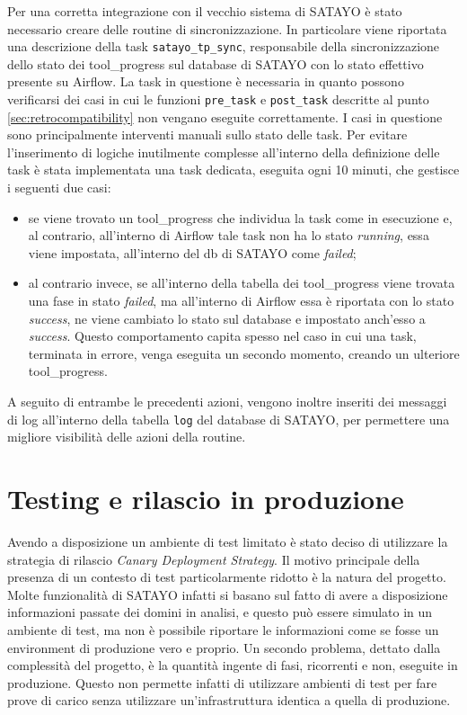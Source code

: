 Per una corretta integrazione con il vecchio sistema di SATAYO è stato necessario
creare delle routine di sincronizzazione. In particolare viene riportata una
descrizione della task \texttt{satayo\_tp\_sync}, responsabile della
sincronizzazione dello stato dei tool\_progress sul database di SATAYO con lo
stato effettivo presente su Airflow. La task in questione è necessaria in quanto
possono verificarsi dei casi in cui le funzioni \texttt{pre\_task} e \texttt{post\_task}
descritte al punto \ref{sec:retrocompatibility} non vengano eseguite correttamente.
I casi in questione sono principalmente interventi manuali sullo stato delle
task. Per evitare l'inserimento di logiche inutilmente complesse all'interno della
definizione delle task è stata implementata una task dedicata, eseguita ogni 10
minuti, che gestisce i seguenti due casi:

\begin{itemize}
  \item se viene trovato un tool\_progress che individua la task come in esecuzione
    e, al contrario, all'interno di Airflow tale task non ha lo stato \textit{running},
    essa viene impostata, all'interno del db di SATAYO come \textit{failed};

  \item al contrario invece, se all'interno della tabella dei tool\_progress
    viene trovata una fase in stato \textit{failed}, ma all'interno di Airflow
    essa è riportata con lo stato \textit{success}, ne viene cambiato lo stato
    sul database e impostato anch'esso a \textit{success}. Questo comportamento
    capita spesso nel caso in cui una task, terminata in errore, venga eseguita
    un secondo momento, creando un ulteriore tool\_progress.
\end{itemize}

A seguito di entrambe le precedenti azioni, vengono inoltre inseriti dei messaggi
di log all'interno della tabella \texttt{log} del database di SATAYO, per permettere
una migliore visibilità delle azioni della routine.

\section{Testing e rilascio in produzione}
\label{sec:deployment}

Avendo a disposizione un ambiente di test limitato è stato deciso di utilizzare
la strategia di rilascio \textit{Canary Deployment Strategy}. Il motivo
principale della presenza di un contesto di test particolarmente ridotto è la
natura del progetto. Molte funzionalità di SATAYO infatti si basano sul fatto di
avere a disposizione informazioni passate dei domini in analisi, e questo può
essere simulato in un ambiente di test, ma non è possibile riportare le informazioni
come se fosse un environment di produzione vero e proprio. Un secondo problema, dettato
dalla complessità del progetto, è la quantità ingente di fasi, ricorrenti e non,
eseguite in produzione. Questo non permette infatti di utilizzare ambienti di test
per fare prove di carico senza utilizzare un'infrastruttura identica a quella di
produzione.

